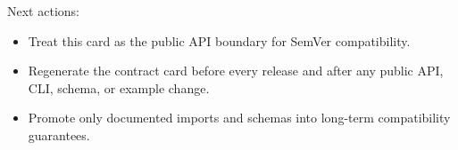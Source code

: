 \noindent Next actions:
\begin{itemize}
\item Treat this card as the public API boundary for SemVer compatibility.
\item Regenerate the contract card before every release and after any public API, CLI, schema, or example change.
\item Promote only documented imports and schemas into long-term compatibility guarantees.
\end{itemize}
